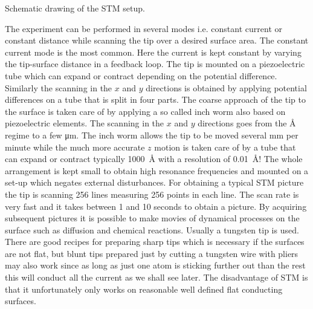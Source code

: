 \vspace*{11cm}

 Schematic drawing of the STM setup.

\vspace{1cm}

The experiment can be performed in several modes i.e. constant current or constant distance while scanning the tip over a desired surface area. The constant current mode is the most common. Here the current is kept constant by varying the tip-surface distance in a feedback loop. The tip is mounted on a piezoelectric tube which can expand or contract depending on the potential difference. Similarly the scanning in the $x$ and $y$ directions is obtained by applying potential differences on a tube that is split in four parts. The coarse approach of the tip to the surface is taken care of by applying a so called inch worm also based on piezoelectric elements. The scanning in the $x$ and $y$ directions goes from the \si{\angstrom} regime to a few \si{\micro m}. The inch worm allows the tip to be moved several \si{mm} per minute while the much more accurate $z$ motion is taken care of by a tube that can expand or contract typically \SI{1000}{\angstrom} with a resolution of \SI{.01}{\angstrom}! The whole arrangement is kept small to obtain high resonance frequencies and mounted on a set-up which negates external disturbances. For obtaining a typical STM picture the tip is scanning 256 lines measuring 256 points in each line. The scan rate is very fast and it takes between 1 and 10 seconds to obtain a picture. By acquiring subsequent pictures it is possible to make movies of dynamical processes on the surface such as diffusion and chemical reactions. Usually a tungsten tip is used. There are good recipes for preparing sharp tips which is necessary if the surfaces are not flat, but blunt tips prepared just by cutting a tungsten wire with pliers may also work since as long as just one atom is sticking further out than the rest this will conduct all the current as we shall see later. The disadvantage of STM is  that it unfortunately only works on reasonable well defined flat conducting surfaces.


